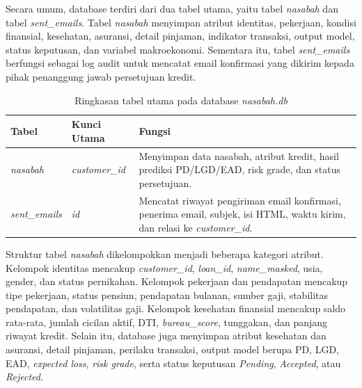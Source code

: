 Secara umum, database terdiri dari dua tabel utama, yaitu tabel \textit{nasabah} dan tabel \textit{sent\_emails}. Tabel \textit{nasabah} menyimpan atribut identitas, pekerjaan, kondisi finansial, kesehatan, asuransi, detail pinjaman, indikator transaksi, output model, status keputusan, dan variabel makroekonomi. Sementara itu, tabel \textit{sent\_emails} berfungsi sebagai log audit untuk mencatat email konfirmasi yang dikirim kepada pihak penanggung jawab persetujuan kredit.

\begin{table}[H]
\centering
\caption{Ringkasan tabel utama pada database \textit{nasabah.db}}
\label{tab:bab4_database_tables}
\begin{tabular}{|p{}|p{}|p{}|}
\hline
\textbf{Tabel} & \textbf{Kunci Utama} & \textbf{Fungsi} \\
\hline
\textit{nasabah} & \textit{customer\_id} & Menyimpan data nasabah, atribut kredit, hasil prediksi PD/LGD/EAD, risk grade, dan status persetujuan. \\
\hline
\textit{sent\_emails} & \textit{id} & Mencatat riwayat pengiriman email konfirmasi, penerima email, subjek, isi HTML, waktu kirim, dan relasi ke \textit{customer\_id}. \\
\hline
\end{tabular}
\end{table}

Struktur tabel \textit{nasabah} dikelompokkan menjadi beberapa kategori atribut. Kelompok identitas mencakup \textit{customer\_id}, \textit{loan\_id}, \textit{name\_masked}, usia, gender, dan status pernikahan. Kelompok pekerjaan dan pendapatan mencakup tipe pekerjaan, status pensiun, pendapatan bulanan, sumber gaji, stabilitas pendapatan, dan volatilitas gaji. Kelompok kesehatan finansial mencakup saldo rata-rata, jumlah cicilan aktif, DTI, \textit{bureau\_score}, tunggakan, dan panjang riwayat kredit. Selain itu, database juga menyimpan atribut kesehatan dan asuransi, detail pinjaman, perilaku transaksi, output model berupa PD, LGD, EAD, \textit{expected loss}, \textit{risk grade}, serta status keputusan \textit{Pending}, \textit{Accepted}, atau \textit{Rejected}.

